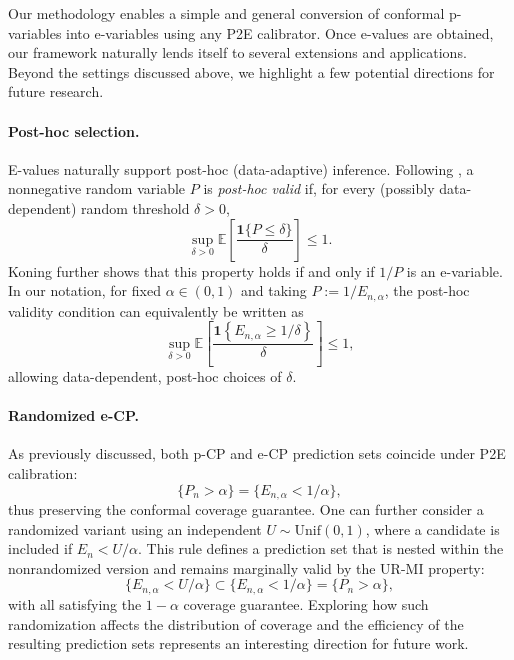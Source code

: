 \documentclass{article}
\theoremstyle{plain}
\theoremstyle{definition}
\theoremstyle{remark}
\begin{document}
Our methodology enables a simple and general conversion of conformal p-variables into e-variables using any P2E calibrator. 
Once e-values are obtained, our framework naturally lends itself to several extensions and applications. 
Beyond the settings discussed above, we highlight a few potential directions for future research.


\paragraph{Post-hoc selection.}
E-values naturally support post-hoc (data-adaptive) inference. 
Following \citet{koning2023post}, a nonnegative random variable \(P\) is \emph{post-hoc valid} 
if, for every (possibly data-dependent) random threshold \(\delta > 0\),
\[
\sup_{\delta > 0} 
\mathbb{E}\!\left[\frac{\mathbf{1}\{P \le \delta\}}{\delta}\right] \le 1.
\]
Koning further shows that this property holds if and only if \(1/P\) is an e-variable. 
In our notation, for fixed \(\alpha \in (0,1)\) and taking $P:=1/E_{n,\alpha}$,
the post-hoc validity condition can equivalently be written as
\[
\sup_{\delta > 0} 
\mathbb{E}\!\left[\frac{\mathbf{1}\!\left\{E_{n,\alpha} \ge 1/\delta\right\}}{\delta}\right] 
\le 1,
\]
allowing data-dependent, post-hoc choices of \(\delta\).

\paragraph{Randomized e-CP.}
As previously discussed, both p-CP and e-CP prediction sets coincide under P2E calibration:
\[
\{P_n > \alpha\} = \{E_{n,\alpha} < 1/\alpha\},
\]
thus preserving the conformal coverage guarantee. 
One can further consider a randomized variant using an independent \(U \sim \mathrm{Unif}(0,1)\), 
where a candidate is included if \(E_n < U/\alpha\). 
This rule defines a prediction set that is nested within the nonrandomized version 
and remains marginally valid by the UR-MI property:
\[
\{E_{n,\alpha} < U/\alpha\} \subset 
\{E_{n,\alpha} < 1/\alpha\} = \{P_n > \alpha\},
\]
with all satisfying the  \(1 - \alpha\) coverage guarantee. 
Exploring how such randomization affects the distribution of coverage and the efficiency 
of the resulting prediction sets represents an interesting direction for future work.
\end{document}
